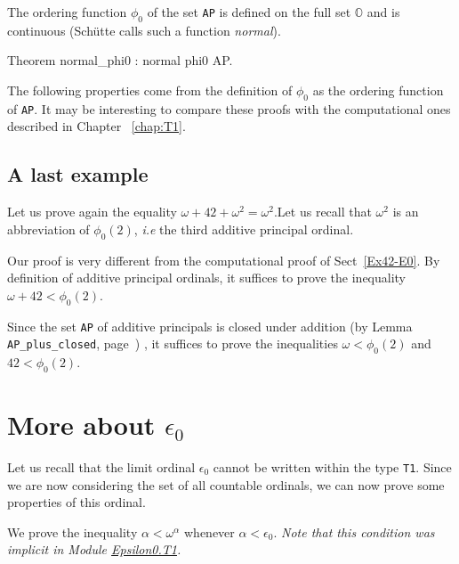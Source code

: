 The ordering function $\phi_0$ of the set \texttt{AP} is defined on the full set $\mathbb{O}$ and is continuous (Schütte calls such a  function  \emph{normal}).

\begin{Coqsrc}
Theorem normal_phi0 : normal phi0 AP.
\end{Coqsrc}

The following properties come from  the definition of $\phi_0$ as the ordering function of \texttt{AP}. It may be interesting to compare these proofs with the computational ones described in Chapter ~\ref{chap:T1}.



\subsection{A last example}
\label{Ex42-schutte}

Let us prove again the equality $\omega+42+\omega^2= \omega^2$.Let us recall that $\omega^2$ is an abbreviation of $\phi_0(2)$,
\emph{i.e} the third  additive principal ordinal.



Our proof is very different from the computational proof of Sect~\vref{Ex42-E0}.
By definition of additive principal ordinals, 
it suffices to prove the inequality $\omega+42< \phi_0(2)$.


Since the set \texttt{AP} of additive principals  is closed under addition
(by Lemma \texttt{AP\_plus\_closed}, page~\pageref{lemma:AP-plus-closed}) , it suffices to prove the inequalities $\omega<\phi_0(2)$ and $42<\phi_0(2)$.


\section{More about \texorpdfstring{$\epsilon_0$}{\texttt{epsilon0}}}

Let us recall that the limit ordinal  $\epsilon_0$ cannot be written within the type \texttt{T1}. Since we are now considering the set of all countable ordinals, we can now prove some properties of this ordinal.


We prove the inequality  $\alpha<\omega^\alpha$ whenever $\alpha < \epsilon_0$.
\emph{Note that this condition was implicit in Module
\href{../theories/html/hydras.Epsilon0.T1.html\#lt_phi0}{Epsilon0.T1}.}

